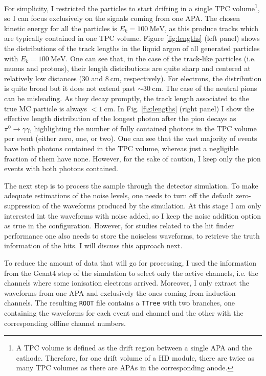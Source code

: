 For simplicity, I restricted the particles to start drifting in a single TPC volume\footnote{A TPC volume is defined as the drift region between a single APA and the cathode. Therefore, for one drift volume of a HD module, there are twice as many TPC volumes as there are APAs in the corresponding anode.}, so I can focus exclusively on the signals coming from one APA. The chosen kinetic energy for all the particles is $E_{k} = 100 \ \mathrm{MeV}$, as this produce tracks which are typically contained in one TPC volume. Figure \ref{fig:lengths} (left panel) shows the distributions of the track lengths in the liquid argon of all generated particles with $E_{k} = 100 \ \mathrm{MeV}$. One can see that, in the case of the track-like particles (i.e. muons and protons), their length distributions are quite sharp and centered at relatively low distances ($30$ and $8 \ \mathrm{cm}$, respectively). For electrons, the distribution is quite broad but it does not extend past $\sim 30 \ \mathrm{cm}$. The case of the neutral pions can be misleading. As they decay promptly, the track length associated to the true MC particle is always $< 1 \ \mathrm{cm}$. In Fig. \ref{fig:lengths} (right panel) I show the effective length distribution of the longest photon after the pion decays as $\pi^{0} \rightarrow \gamma \gamma$, highlighting the number of fully contained photons in the TPC volume per event (either zero, one, or two). One can see that the vast majority of events have both photons contained in the TPC volume, whereas just a negligible fraction of them have none. However, for the sake of caution, I keep only the pion events with both photons contained.

The next step is to process the sample through the detector simulation. To make adequate estimations of the noise levels, one needs to turn off the default zero-suppression of the waveforms produced by the simulation. At this stage I am only interested int the waveforms with noise added, so I keep the noise addition option as true in the configuration. However, for studies related to the hit finder performance one also needs to store the noiseless waveforms, to retrieve the truth information of the hits. I will discuss this approach next.

To reduce the amount of data that will go for processing, I used the information from the Geant4 step of the simulation to select only the active channels, i.e. the channels where some ionisation electrons arrived. Moreover, I only extract the waveforms from one APA and exclusively the ones coming from induction channels. The resulting \texttt{ROOT} file contains a \texttt{TTree} with two branches, one containing the waveforms for each event and channel and the other with the corresponding offline channel numbers.

